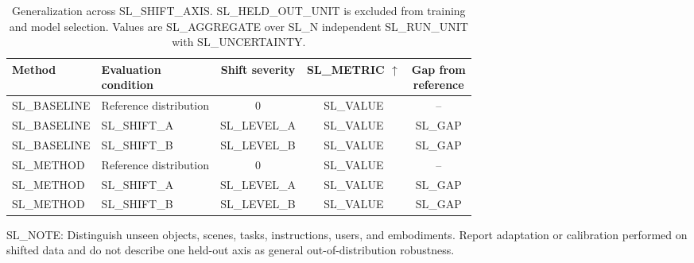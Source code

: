 \begin{table}[t]
  \centering
  \small
  \caption{Generalization across SL_SHIFT_AXIS. SL_HELD_OUT_UNIT is excluded
  from training and model selection. Values are SL_AGGREGATE over SL_N
  independent SL_RUN_UNIT with SL_UNCERTAINTY.}
  \label{tab:SL_LABEL}
  \begin{tabular}{llccc}
    \toprule
    Method & \shortstack{Evaluation\\condition} & Shift severity & SL_METRIC $\uparrow$ &
    \shortstack{Gap from\\reference} \\
    \midrule
    SL_BASELINE & Reference distribution & 0 & SL_VALUE & -- \\
    SL_BASELINE & SL_SHIFT_A & SL_LEVEL_A & SL_VALUE & SL_GAP \\
    SL_BASELINE & SL_SHIFT_B & SL_LEVEL_B & SL_VALUE & SL_GAP \\
    \midrule
    SL_METHOD & Reference distribution & 0 & SL_VALUE & -- \\
    SL_METHOD & SL_SHIFT_A & SL_LEVEL_A & SL_VALUE & SL_GAP \\
    SL_METHOD & SL_SHIFT_B & SL_LEVEL_B & SL_VALUE & SL_GAP \\
    \bottomrule
  \end{tabular}

  \parbox{0.98\linewidth}{\footnotesize
  SL_NOTE: Distinguish unseen objects, scenes, tasks, instructions, users, and
  embodiments. Report adaptation or calibration performed on shifted data and
  do not describe one held-out axis as general out-of-distribution robustness.}
\end{table}
